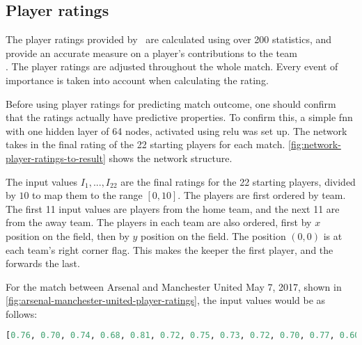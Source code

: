 \subsection{Player ratings}

The player ratings provided by \whoscored\ are calculated using over 200 statistics, and provide an accurate measure on a player's contributions to the team \\ \citep{bib:whoscored-ratings}. The player ratings are adjusted throughout the whole match. Every event of importance is taken into account when calculating the rating.

Before using player ratings for predicting match outcome, one should confirm that the ratings actually have predictive properties. To confirm this, a simple \gls{fnn} with one hidden layer of 64 nodes, activated using \gls{relu} was set up. The network takes in the final rating of the 22 starting players for each match. \cref{fig:network-player-ratings-to-result} shows the network structure. 

The input values $I_{1}, ..., I_{22}$ are the final ratings for the 22 starting players, divided by $10$ to map them to the range $[0, 10]$. The players are first ordered by team. The first 11 input values are players from the home team, and the next 11 are from the away team. The players in each team are also ordered, first by $x$ position on the field, then by $y$ position on the field. The position $(0, 0)$ is at each team's right corner flag. This makes the keeper the first player, and the forwards the last.

For the match between Arsenal and Manchester United May 7, 2017, shown in \cref{fig:arsenal-manchester-united-player-ratings}, the input values would be as follows:
\begin{lstlisting}[language=Python]
    [0.76, 0.70, 0.74, 0.68, 0.81, 0.72, 0.75, 0.73, 0.72, 0.70, 0.77, 0.60, 0.67, 0.62, 0.65, 0.66, 0.65, 0.67, 0.61, 0.69, 0.66, 0.65]
\end{lstlisting}

